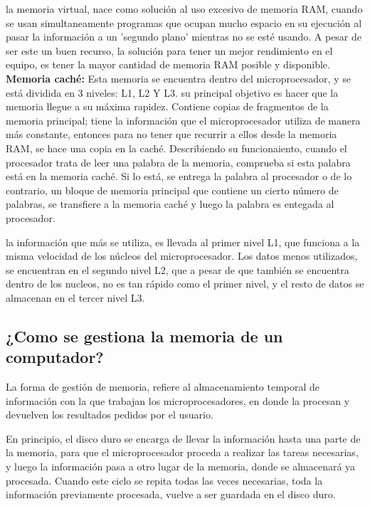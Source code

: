 \documentclass{article}
\begin{document}
la memoria virtual, nace como solución al uso excesivo de memoria RAM, cuando se usan simultaneamente programas que ocupan mucho espacio en su ejecución al pasar la información a un 'segundo plano' mientras no se esté usando.
A pesar de ser este un buen recurso, la solución para tener un mejor rendimiento en el equipo, es tener la mayor cantidad de memoria RAM posible y disponible.\\

\textbf{Memoria caché:} Esta memoria se encuentra dentro del microprocesador, y se está dividida en 3 niveles: L1, L2 Y L3. su principal objetivo es hacer que la memoria llegue a su máxima rapidez. Contiene copias de fragmentos de la memoria principal; tiene la información que el microprocesador utiliza de manera más constante, entonces para no tener que recurrir a ellos desde la memoria RAM, se hace una copia en la caché.  
Describiendo su funcionaiento, cuando el procesador trata de leer una palabra de la memoria, comprueba si esta palabra está en la memoria caché. Si lo está, se entrega la palabra al procesador o de lo contrario, un bloque de memoria principal que contiene un cierto número de palabras, se transfiere a la memoria caché y luego la palabra es entegada al procesador.  

la información que más se utiliza, es llevada al primer nivel L1, que funciona a la misma velocidad de los núcleos del microprocesador. Los datos menos utilizados, se encuentran en el segundo nivel L2, que a pesar de que también se encuentra dentro de los nucleos, no es tan rápido como el primer nivel, y el resto de datos se almacenan en el tercer nivel L3. 
 
\subsection{¿Como se gestiona la memoria de un computador?}
%
La forma de gestión de memoria, refiere al almacenamiento temporal de información con la que trabajan los microprocesadores, en donde la procesan y devuelven los resultados pedidos por el usuario.

En principio, el disco duro se encarga de llevar la información hasta una parte de la memoria, para que el microprocesador proceda a realizar las tareas necesarias, y luego la información pasa a otro lugar de la memoria, donde se almacenará ya procesada.
Cuando este ciclo se repita todas las veces necesarias, toda la información previamente procesada, vuelve a ser guardada en el disco duro.
\end{document}
